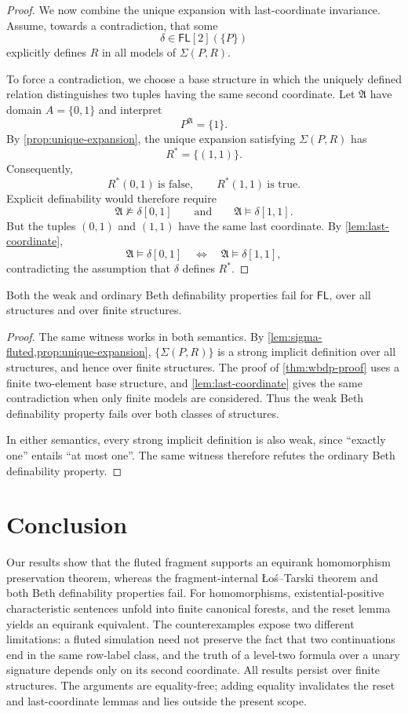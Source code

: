 \documentclass{lmcs}
\newcommand{\FL}{\mathsf{FL}}
\newcommand{\A}{\mathfrak{A}}
\begin{document}
\begin{proof}
We now combine the unique expansion with last-coordinate invariance.  Assume,
towards a contradiction, that some
\[
  \delta\in\FL[2](\{P\})
\]
explicitly defines $R$ in all models of $\Sigma(P,R)$.

To force a contradiction, we choose a base structure in which the uniquely
defined relation distinguishes two tuples having the same second coordinate.
Let $\A$ have domain $A=\{0,1\}$ and interpret
\[
   P^{\A}=\{1\}.
\]
By \cref{prop:unique-expansion}, the unique expansion satisfying
$\Sigma(P,R)$ has
\[
   R^{\ast}=\{(1,1)\}.
\]
Consequently,
\[
   R^{\ast}(0,1)\ \text{is false},
   \qquad
   R^{\ast}(1,1)\ \text{is true}.
\]
Explicit definability would therefore require
\[
  \A\not\models\delta[0,1]
  \qquad\text{and}\qquad
  \A\models\delta[1,1].
\]
But the tuples $(0,1)$ and $(1,1)$ have the same last coordinate.  By
\cref{lem:last-coordinate},
\[
  \A\models\delta[0,1]
  \quad\Longleftrightarrow\quad
  \A\models\delta[1,1],
\]
contradicting the assumption that $\delta$ defines $R^{\ast}$.
\end{proof}

\begin{cor}\label{cor:wbdp-finite}
Both the weak and ordinary Beth definability properties fail for $\FL$, over
all structures and over finite structures.
\end{cor}

\begin{proof}
The same witness works in both semantics.  By
\cref{lem:sigma-fluted,prop:unique-expansion}, $\{\Sigma(P,R)\}$ is a strong
implicit definition over all structures, and hence over finite structures.
The proof of \cref{thm:wbdp-proof} uses a finite two-element base structure,
and \cref{lem:last-coordinate} gives the same contradiction when only finite
models are considered.  Thus the weak Beth definability property fails over
both classes of structures.

In either semantics, every strong implicit definition is also weak, since
``exactly one'' entails ``at most one''.  The same witness therefore refutes
the ordinary Beth definability property.
\end{proof}

\section{Conclusion}\label{sec:conclusion}

Our results show that the fluted fragment supports an equirank homomorphism
preservation theorem, whereas the fragment-internal \L o\'s--Tarski theorem
and both Beth definability properties fail.  For homomorphisms,
existential-positive characteristic sentences unfold into finite canonical
forests, and the reset lemma yields an equirank equivalent.  The
counterexamples expose two different limitations: a fluted simulation need
not preserve the fact that two continuations end in the same row-label class,
and the truth of a level-two formula over a unary signature depends only on
its second coordinate.  All results persist over finite structures.  The
arguments are equality-free; adding equality invalidates the reset and
last-coordinate lemmas and lies outside the present scope.
\end{document}
